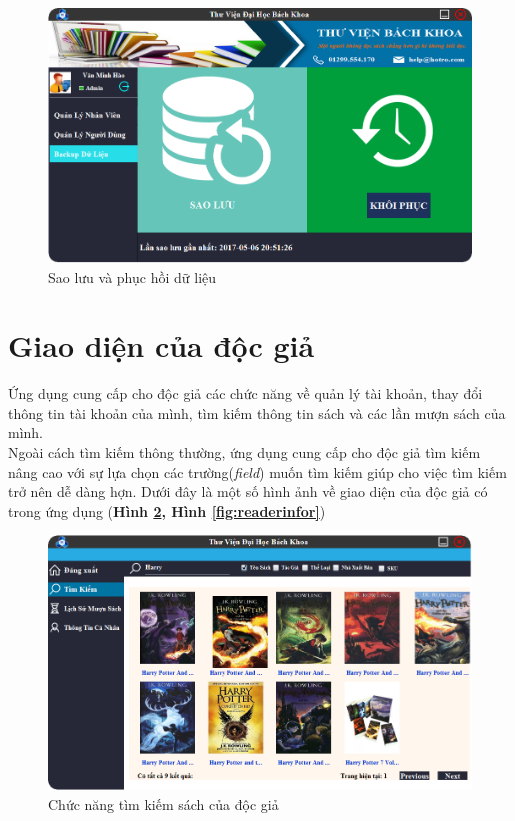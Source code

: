 \documentclass[12pt]{report}
\begin{document}
\begin{itemize}
						\begin{figure}[H]
						\centering
						\includegraphics[scale=0.6]{images/backup.png}
						\caption{Sao lưu và phục hồi dữ liệu}
						\label{fig:backup}
						\end{figure}			
				\end{itemize}
			\section{Giao diện của độc giả}
			Ứng dụng cung cấp cho độc giả các chức năng về quản lý tài khoản, thay đổi thông tin tài khoản của mình, tìm kiếm thông tin sách và các lần mượn sách của mình.\\
			Ngoài cách tìm kiếm thông thường, ứng dụng cung cấp cho độc giả tìm kiếm nâng cao với sự lựa chọn các trường(\textit{field}) muốn tìm kiếm giúp cho việc tìm kiếm trở nên dễ dàng hợn.
			Dưới đây là một số hình ảnh về giao diện của độc giả có trong ứng dụng (\textbf{Hình \ref{fig:rdsearch}, Hình \ref{fig:readerinfor}})
						\begin{figure}[H]
						\centering
						\includegraphics[scale=0.65]{images/searchreader.png}
						\caption{Chức năng tìm kiếm sách của độc giả}
						\label{fig:rdsearch}
						\end{figure}
						
\end{document}
